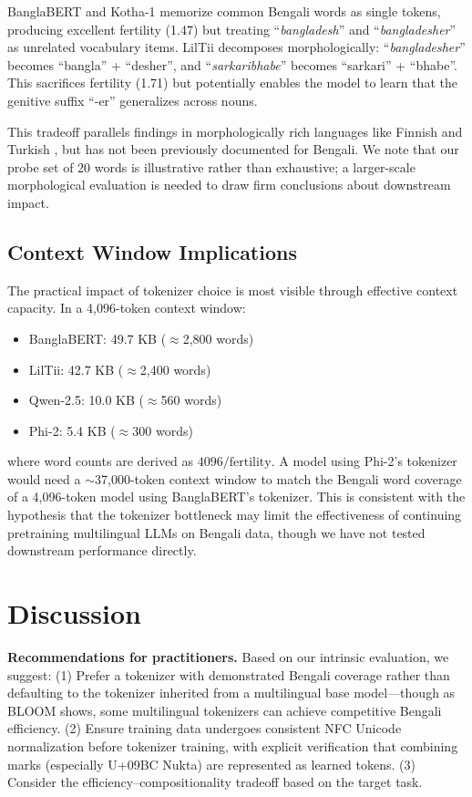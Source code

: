 \documentclass[11pt,a4paper]{article}
\begin{document}
BanglaBERT and Kotha-1 memorize common Bengali words as single tokens, producing excellent fertility (1.47) but treating ``\textit{bangladesh}'' and ``\textit{bangladesher}'' as unrelated vocabulary items.
LilTii decomposes morphologically: ``\textit{bangladesher}'' becomes ``bangla'' + ``desher'', and ``\textit{sarkaribhabe}'' becomes ``sarkari'' + ``bhabe''.
This sacrifices fertility (1.71) but potentially enables the model to learn that the genitive suffix ``-er'' generalizes across nouns.

This tradeoff parallels findings in morphologically rich languages like Finnish and Turkish \cite{virpioja2013morphological}, but has not been previously documented for Bengali.
We note that our probe set of 20 words is illustrative rather than exhaustive; a larger-scale morphological evaluation is needed to draw firm conclusions about downstream impact.

\subsection{Context Window Implications}

The practical impact of tokenizer choice is most visible through effective context capacity.
In a 4,096-token context window:

\begin{itemize}
    \item BanglaBERT: 49.7 KB ($\approx$2,800 words)
    \item LilTii: 42.7 KB ($\approx$2,400 words)
    \item Qwen-2.5: 10.0 KB ($\approx$560 words)
    \item Phi-2: 5.4 KB ($\approx$300 words)
\end{itemize}

\noindent where word counts are derived as $4096 / \text{fertility}$.
A model using Phi-2's tokenizer would need a $\sim$37,000-token context window to match the Bengali word coverage of a 4,096-token model using BanglaBERT's tokenizer.
This is consistent with the hypothesis that the tokenizer bottleneck may limit the effectiveness of continuing pretraining multilingual LLMs on Bengali data, though we have not tested downstream performance directly.

\section{Discussion}

\textbf{Recommendations for practitioners.} Based on our intrinsic evaluation, we suggest:
(1) Prefer a tokenizer with demonstrated Bengali coverage rather than defaulting to the tokenizer inherited from a multilingual base model---though as BLOOM shows, some multilingual tokenizers can achieve competitive Bengali efficiency.
(2) Ensure training data undergoes consistent NFC Unicode normalization before tokenizer training, with explicit verification that combining marks (especially U+09BC Nukta) are represented as learned tokens.
(3) Consider the efficiency--compositionality tradeoff based on the target task.
\end{document}
